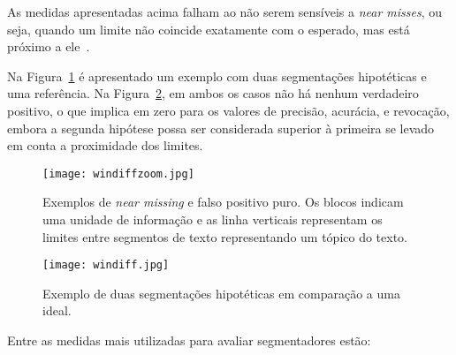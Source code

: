 As medidas apresentadas acima falham ao não serem sensíveis a \textit{near misses}, ou seja, quando um limite não coincide exatamente com o esperado, mas está próximo a ele~\cite{Kern2009}.

Na Figura~\ref{fig:exemplosegmentacaozoom} é apresentado um exemplo com duas segmentações hipotéticas e uma referência. Na Figura~\ref{fig:exemplosegmentacao}, em ambos os casos não há nenhum verdadeiro positivo, o que implica em zero para os valores de precisão, acurácia, e revocação, embora a segunda hipótese possa ser considerada superior à primeira se levado em conta a proximidade dos limites.



  \begin{figure}[!h]

	\centering
	\texttt{[image: windiffzoom.jpg]}
	\caption{Exemplos de \textit{near missing} e falso positivo puro. Os blocos indicam uma unidade de informação e as linha verticais representam os limites entre segmentos de texto representando um tópico do texto. }
	\label{fig:exemplosegmentacaozoom}

  \end{figure}
  
  \begin{figure}[!h]

	\centering
	\texttt{[image: windiff.jpg]}
	\caption{
	Exemplo de duas segmentações hipotéticas em comparação a uma ideal. 
	}
	\label{fig:exemplosegmentacao}

  \end{figure}
  
  
Entre as medidas mais utilizadas para avaliar segmentadores estão:

